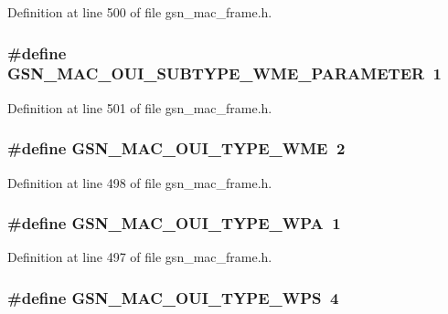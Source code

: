 Definition at line 500 of file gsn\_\-mac\_\-frame.h.

\hypertarget{a00523_ab04bdbd8836b8fab4d561f1b23f4257c}{
\subsubsection[{GSN\_\-MAC\_\-OUI\_\-SUBTYPE\_\-WME\_\-PARAMETER}]{\setlength{\rightskip}{0pt plus 5cm}\#define GSN\_\-MAC\_\-OUI\_\-SUBTYPE\_\-WME\_\-PARAMETER~1}}
\label{a00523_ab04bdbd8836b8fab4d561f1b23f4257c}


Definition at line 501 of file gsn\_\-mac\_\-frame.h.

\hypertarget{a00523_a66775dc97097a30522a6d176983df16b}{
\subsubsection[{GSN\_\-MAC\_\-OUI\_\-TYPE\_\-WME}]{\setlength{\rightskip}{0pt plus 5cm}\#define GSN\_\-MAC\_\-OUI\_\-TYPE\_\-WME~2}}
\label{a00523_a66775dc97097a30522a6d176983df16b}


Definition at line 498 of file gsn\_\-mac\_\-frame.h.

\hypertarget{a00523_aca3cf8892fe1262f30879cec6e140564}{
\subsubsection[{GSN\_\-MAC\_\-OUI\_\-TYPE\_\-WPA}]{\setlength{\rightskip}{0pt plus 5cm}\#define GSN\_\-MAC\_\-OUI\_\-TYPE\_\-WPA~1}}
\label{a00523_aca3cf8892fe1262f30879cec6e140564}


Definition at line 497 of file gsn\_\-mac\_\-frame.h.

\hypertarget{a00523_a272d730c13aa3c144b02980adc31b742}{
\subsubsection[{GSN\_\-MAC\_\-OUI\_\-TYPE\_\-WPS}]{\setlength{\rightskip}{0pt plus 5cm}\#define GSN\_\-MAC\_\-OUI\_\-TYPE\_\-WPS~4}}
\label{a00523_a272d730c13aa3c144b02980adc31b742}


